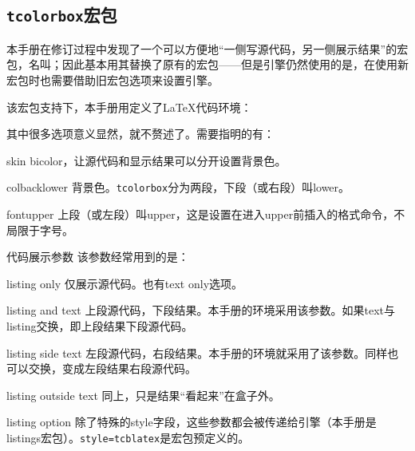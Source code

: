 \subsection{\texttt{tcolorbox}宏包}
\label{subsec:tcolorbox}
本手册在修订过程中发现了一个可以方便地“一侧写源代码，另一侧展示结果”的宏包，名叫；因此基本用其替换了原有的宏包——但是引擎仍然使用的是，在使用新宏包时也需要借助旧宏包选项来设置引擎。

该宏包支持下，本手册用定义了\LaTeX 代码环境：
\begin{latex}
\usepackage{tcolorbox}
\end{latex}

其中很多选项意义显然，就不赘述了。需要指明的有：
\begin{para}
\item[skin] bicolor，让源代码和显示结果可以分开设置背景色。
\item[colbacklower] 背景色。\texttt{tcolorbox}分为两段，下段（或右段）叫lower。
\item[fontupper] 上段（或左段）叫upper，这是设置在进入upper前插入的格式命令，不局限于字号。
\item[代码展示参数] 该参数经常用到的是：
    \begin{para}
      \item[listing only] 仅展示源代码。也有text only选项。
      \item[listing and text] 上段源代码，下段结果。本手册的环境采用该参数。如果text与listing交换，即上段结果下段源代码。
      \item[listing side text] 左段源代码，右段结果。本手册的环境就采用了该参数。同样也可以交换，变成左段结果右段源代码。
      \item[listing outside text] 同上，只是结果“看起来”在盒子外。
    \end{para}
\item[listing option] 除了特殊的style字段，这些参数都会被传递给引擎（本手册是listings宏包）。\texttt{style=tcblatex}是宏包预定义的。
\end{para}


